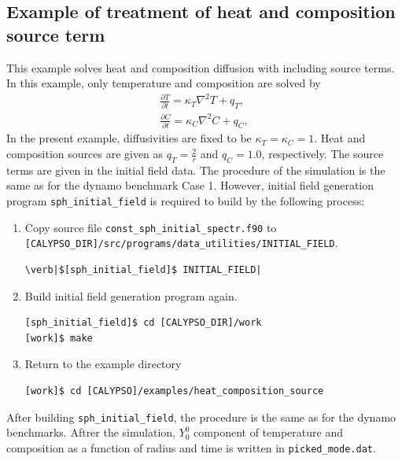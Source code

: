 \subsection{Example of treatment of heat and composition source term}
This example solves heat and composition diffusion with including source terms. In this example, only temperature and composition are solved by
%
\begin{eqnarray}
\frac{\partial T}{\partial t} =  \kappa_{T} \nabla^{2} T + q_{T},
\nonumber \\
\frac{\partial C}{\partial t} = \kappa_{C} \nabla^{2} C + q_{C},
\nonumber
\end{eqnarray}
%
 In the present example, diffusivities are fixed to be $\kappa_{T} = \kappa_{C} = 1$. Heat and composition sources are given as
$q_{T} = \frac{2}{r}$ and $q_{C} = 1.0$, respectively. The source terms are given in the initial field data. The procedure of the simulation is the same as for the dynamo benchmark Case 1. However, initial field generation program \verb|sph_initial_field| is required to build by the following process:

\begin{enumerate}
\item Copy source file \verb|const_sph_initial_spectr.f90| to \\
 \verb|[CALYPSO_DIR]/src/programs/data_utilities/INITIAL_FIELD|.
\begin{verbatim}
\verb|$[sph_initial_field]$ INITIAL_FIELD|
\end{verbatim}

\item Build initial field generation program again.
\begin{verbatim}
[sph_initial_field]$ cd [CALYPSO_DIR]/work
[work]$ make
\end{verbatim}

\item Return to the example directory
\begin{verbatim}
[work]$ cd [CALYPSO]/examples/heat_composition_source
\end{verbatim}

\end{enumerate}
After building \verb|sph_initial_field|, the procedure is the same as for the dynamo benchmarks. Aftrer the simulation, $Y_{0}^{0}$ component of temperature and composition as a function of radius and time is written in \verb|picked_mode.dat|.


